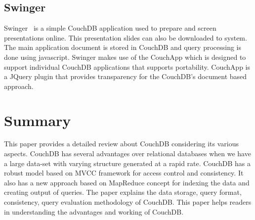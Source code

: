 \documentclass{sig-alternate}
\begin{document}
\subsection{Swinger}
\label{swinger}
Swinger~\cite{swinger} is a simple CouchDB application used to prepare and screen presentations online. This presentation slides can also be downloaded to system. The main application document is stored in CouchDB and query processing is done using javascript. Swinger  makes use of the CouchApp which is designed to support individual CouchDB applications that supports portability. CouchApp is a JQuery plugin that provides transparency for the CouchDB's document based approach.

\section{Summary}
\label{summary}
This paper provides a detailed review about CouchDB considering its various aspects. CouchDB has several advantages over relational databases when we have a large data-set with varying structure generated at a rapid rate. CouchDB has a robust model based on MVCC framework for access control and consistency. It also has a new approach based on MapReduce concept for indexing the data and creating output of queries. The paper explains the data storage, query format, consistency, query evaluation methodology of CouchDB. This paper helps readers in understanding the advantages and working of CouchDB.





\balance
\end{document}
